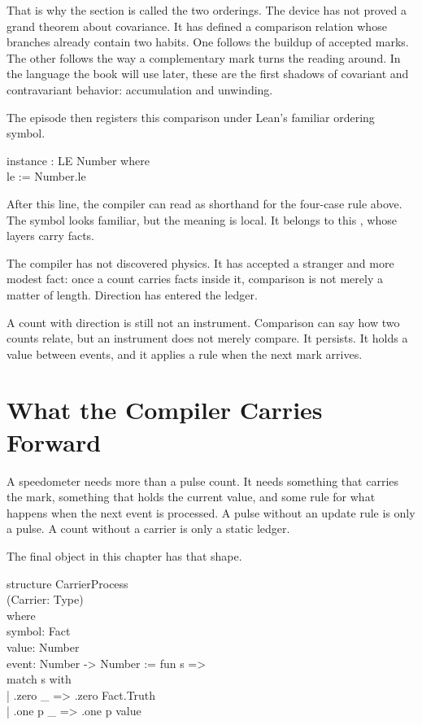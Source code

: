 That is why the section is called the two orderings. The device has not proved
a grand theorem about covariance. It has defined a comparison relation whose
branches already contain two habits. One follows the buildup of accepted marks.
The other follows the way a complementary mark turns the reading around. In the
language the book will use later, these are the first shadows of covariant and
contravariant behavior: accumulation and unwinding.

The episode then registers this comparison under Lean's familiar ordering
symbol.

\begin{leancode}
instance : LE Number where\\
\quad le := Number.le
\end{leancode}

After this line, the compiler can read  as shorthand for the
four-case rule above. The symbol looks familiar, but the meaning is local. It
belongs to this , whose layers carry facts.

The compiler has not discovered physics. It has accepted a stranger and more
modest fact: once a count carries facts inside it, comparison is not merely a
matter of length. Direction has entered the ledger.

A count with direction is still not an instrument. Comparison can say how two
counts relate, but an instrument does not merely compare. It persists. It holds
a value between events, and it applies a rule when the next mark arrives.

\section{What the Compiler Carries Forward}
\label{se:what-compiler-carries}

A speedometer needs more than a pulse count. It needs something that carries
the mark, something that holds the current value, and some rule for what happens
when the next event is processed. A pulse without an update rule is only a
pulse. A count without a carrier is only a static ledger.

The final object in this chapter has that shape.

\begin{leancode}
structure CarrierProcess\\
\quad (Carrier: Type)\\
\quad where\\
\quad symbol: Fact\\
\quad value: Number\\
\quad event: Number -> Number := fun s =>\\
\quad\quad match s with\\
\quad\quad | .zero \_ => .zero Fact.Truth\\
\quad\quad | .one p \_ => .one p value
\end{leancode}

